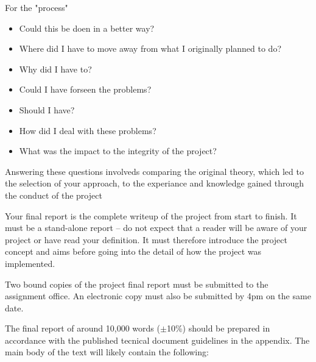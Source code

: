 For the "process"

\begin{itemize}
    \item Could this be doen in a better way?
    \item Where did I have to move away from what I originally planned to do?
    \item Why did I have to? 
    \item Could I have forseen the problems?
    \item Should I have?
    \item How did I deal with these problems? 
    \item What was the impact to the integrity of the project?
\end{itemize}

Answering these questions involveds comparing the original theory, which led to the selection of your approach, to the experiance and knowledge gained through the conduct of the project

Your final report is the complete writeup of the project from start to finish. It must be a stand-alone
report – do not expect that a reader will be aware of your project or have read your definition. It
must therefore introduce the project concept and aims before going into the detail of how the project
was implemented.

\begin{tcolorbox}
    Two bound copies of the project final report must be submitted to the assignment office. An electronic copy must also be submitted by 4pm on the same date.
\end{tcolorbox}

The final report of around 10,000 words ($\pm$10\%) should be prepared in accordance with the published tecnical document guidelines in the appendix. The main body of the text will likely contain the following: 

